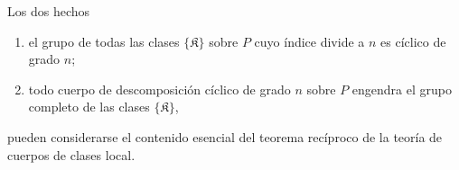 Los dos hechos

\begin{enumerate}
\item el grupo de todas las clases $\{\mathfrak K\}$ sobre $P$ cuyo índice divide a $n$ es cíclico de grado $n$;
\item todo cuerpo de descomposición cíclico de grado $n$ sobre $P$ engendra el grupo completo de las clases $\{\mathfrak K\}$,
\end{enumerate}

pueden considerarse el contenido esencial del teorema recíproco de la teoría de cuerpos de clases local.
